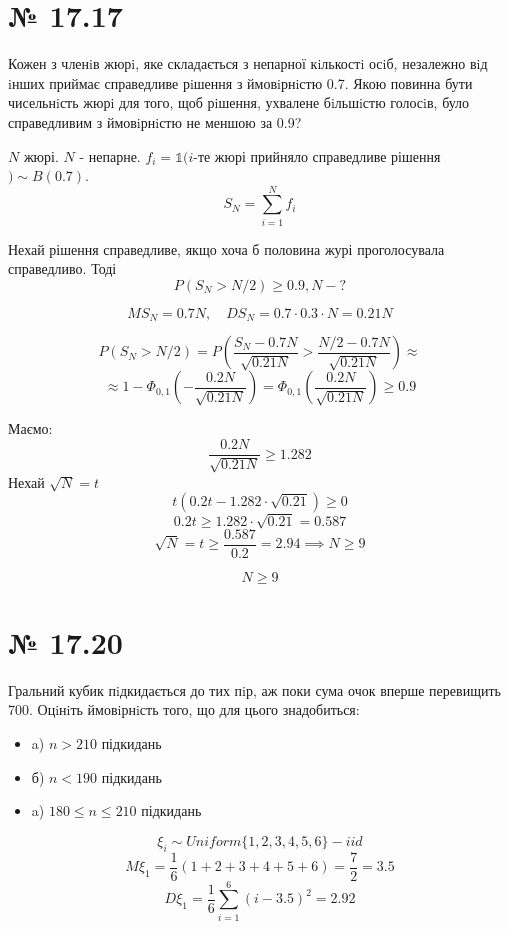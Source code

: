 \documentclass[11pt, a4paper]{article} %
\begin{document}
\section*{№ 17.17}
\begin{mdframed}
    Кожен з членiв жюрi, яке складається з непарної кiлькостi осiб, незалежно 
    вiд iнших приймає справедливе рiшення з ймовiрнiстю 0.7. Якою повинна бути 
    чисельнiсть жюрi для того, щоб рiшення, ухвалене бiльшiстю голосiв, було 
    справедливим з ймовiрнiстю не меншою за 0.9?
\end{mdframed}

\(N\) жюрі. \(N\) - непарне. $f_i = \mathbb{1}(i$-те жюрі прийняло справедливе рішення$) \sim B(0.7)$.
\[S_N = \sum_{i=1}^N f_i\]

Нехай рішення справедливе, якщо хоча б половина журі проголосувала справедливо. Тоді
\[\boxed{P(S_N > N/2) \ge 0.9, N-?}\]

\[MS_N = 0.7 N,\quad DS_N = 0.7 \cdot 0.3 \cdot N = 0.21 N\]

\[P(S_N > N/2) = P\left(\frac{S_N - 0.7 N}{\sqrt{0.21 N}} > \frac{N/2 - 0.7 N}{\sqrt{0.21 N}}\right) \approx\]
\[\approx 1-\Phi_{0,1}\left(-\frac{0.2N}{\sqrt{0.21 N}}\right) = \Phi_{0,1}\left(\frac{0.2N}{\sqrt{0.21 N}}\right) \ge 0.9 \]

Маємо: \[\frac{0.2N}{\sqrt{0.21 N}} \ge 1.282\]
Нехай \(\sqrt{N} = t\)
\[t (0.2 t - 1.282 \cdot \sqrt{0.21}) \ge 0\]
\[0.2 t \ge 1.282 \cdot \sqrt{0.21} = 0.587\]
\[\sqrt{N} = t \ge \frac{0.587}{0.2} = 2.94 \implies N \ge 9\]
\begin{mdframed}[style=ans]
    \[N \ge 9\]
\end{mdframed}
\pagebreak

\section*{№ 17.20}
\begin{mdframed}
    Гральний кубик пiдкидається до тих пiр, аж поки сума очок вперше перевищить 700. 
    Оцiнiть ймовiрнiсть того, що для цього знадобиться:
    \begin{itemize}
        \item a) \(n > 210\) підкидань
        \item б) \(n < 190\) підкидань
        \item a) \(180 \le n \le 210\) підкидань
    \end{itemize}
\end{mdframed}

\[\xi_i \sim Uniform\{1,2,3,4,5,6\} - iid\]
\[M\xi_1 = \frac{1}{6}(1+2+3+4+5+6) = \frac{7}{2} = 3.5\]
\[D\xi_1 = \frac{1}{6}\sum_{i=1}^6(i-3.5)^2 = 2.92\]
\end{document}

